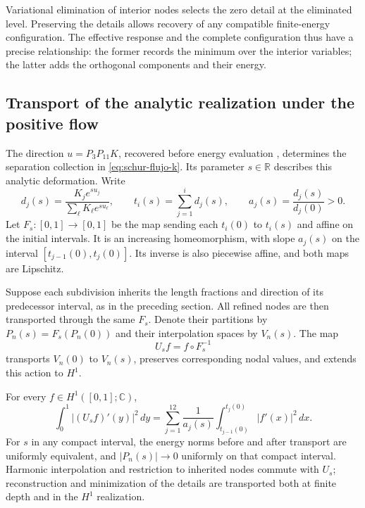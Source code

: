 Variational elimination of interior nodes selects the zero detail
at the eliminated level. Preserving the details allows recovery of
any compatible finite-energy configuration. The effective response
and the complete configuration thus have a precise relationship:
the former records the minimum over the interior variables; the
latter adds the orthogonal components and their energy.

\subsection{Transport of the analytic realization under the positive flow}

The direction \(u=P_3P_{11}K\), recovered before energy evaluation
\cite{hmtX}, determines the separation collection in
\eqref{eq:schur-flujo-k}. Its parameter \(s\in\mathbb R\)
describes this analytic deformation. Write
\[
 d_j(s)=\frac{K_je^{su_j}}{\sum_\ell K_\ell e^{su_\ell}},
 \qquad
 t_i(s)=\sum_{j=1}^id_j(s),
 \qquad
 a_j(s)=\frac{d_j(s)}{d_j(0)}>0.
\]
Let \(F_s:[0,1]\to[0,1]\) be the map sending each \(t_i(0)\)
to \(t_i(s)\) and affine on the initial intervals. It is an
increasing homeomorphism, with slope \(a_j(s)\) on the interval
\([t_{j-1}(0),t_j(0)]\). Its inverse is also piecewise affine,
and both maps are Lipschitz.

Suppose each subdivision inherits the length fractions and direction
of its predecessor interval, as in the preceding section. All refined nodes
are then transported through the same \(F_s\). Denote their partitions
by \(P_n(s)=F_s(P_n(0))\) and their interpolation spaces by
\(V_n(s)\). The map
\[
 U_s f=f\circ F_s^{-1}
\]
transports \(V_n(0)\) to \(V_n(s)\), preserves corresponding
nodal values, and extends this action to \(H^1\).

\begin{theorem}
\label{thm:transporte-h1-flujo-k}
For every \(f\in H^1([0,1];\mathbb C)\),
\begin{equation}
 \int_0^1|(U_sf)'(y)|^2\,dy
 =\sum_{j=1}^{12}\frac1{a_j(s)}
 \int_{t_{j-1}(0)}^{t_j(0)}|f'(x)|^2\,dx.
 \label{eq:transporte-energia-h1-k}
\end{equation}
For \(s\) in any compact interval, the energy norms before and
after transport are uniformly equivalent, and \(|P_n(s)|\to0\)
uniformly on that compact interval. Harmonic interpolation and
restriction to inherited nodes commute with \(U_s\); reconstruction
and minimization of the details are transported both at finite depth
and in the \(H^1\) realization.
\end{theorem}


